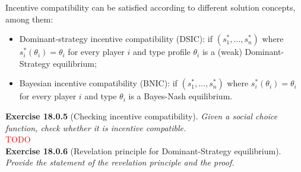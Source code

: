 Incentive compatibility can be satisfied according to different solution concepts, among them:
\begin{itemize} 
\item Dominant-strategy incentive compatibility (DSIC): if $(s^*_1, \ldots, s^*_n)$ where $s^*_i (\theta_i) = \theta_i$ for every player $i$ and type profile $\theta_i$ is a (weak) Dominant-Strategy equilibrium;
\item Bayesian incentive compatibility (BNIC): if $(s^*_1, \ldots, s^*_n)$ where $s^*_i (\theta_i) = \theta_i$ for every player $i$ and type $\theta_i$ is a Bayes-Nash equilibrium.
\end{itemize}

\textbf{Exercise 18.0.5} (Checking incentive compatibility). \textit{Given a social choice function, check whether it is incentive compatible.}\\

\textcolor{red}{TODO}\\

\textbf{Exercise 18.0.6} (Revelation principle for Dominant-Strategy equilibrium). \textit{Provide the statement of the revelation principle and the proof.}\\

